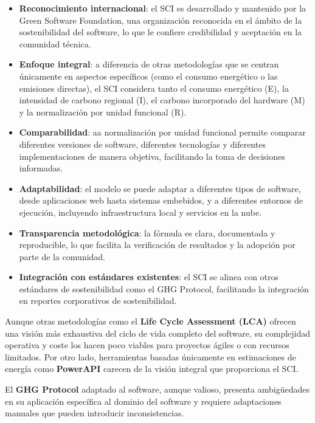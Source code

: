 \documentclass[12pt,a4paper]{report}
\begin{document}
\begin{itemize}
  \item \textbf{Reconocimiento internacional}: el SCI es desarrollado y mantenido por la Green Software Foundation, una organización reconocida en el ámbito de la sostenibilidad del software, lo que le confiere credibilidad y aceptación en la comunidad técnica.

  \item \textbf{Enfoque integral}: a diferencia de otras metodologías que se centran únicamente en aspectos específicos (como el consumo energético o las emisiones directas), el SCI considera tanto el consumo energético (E), la intensidad de carbono regional (I), el carbono incorporado del hardware (M) y la normalización por unidad funcional (R).

  \item \textbf{Comparabilidad}: aa normalización por unidad funcional permite comparar diferentes versiones de software, diferentes tecnologías y diferentes implementaciones de manera objetiva, facilitando la toma de decisiones informadas.

  \item \textbf{Adaptabilidad}: el modelo se puede adaptar a diferentes tipos de software, desde aplicaciones web hasta sistemas embebidos, y a diferentes entornos de ejecución, incluyendo infraestructura local y servicios en la nube.

  \item \textbf{Transparencia metodológica}: la fórmula es clara, documentada y reproducible, lo que facilita la verificación de resultados y la adopción por parte de la comunidad.

  \item \textbf{Integración con estándares existentes}: el SCI se alinea con otros estándares de sostenibilidad como el GHG Protocol, facilitando la integración en reportes corporativos de sostenibilidad.
\end{itemize}

Aunque otras metodologías como el \textbf{Life Cycle Assessment (LCA)} ofrecen una visión más exhaustiva del ciclo de vida completo del software, su complejidad operativa y coste los hacen poco viables para proyectos ágiles o con recursos limitados. Por otro lado, herramientas basadas únicamente en estimaciones de energía como \textbf{PowerAPI} carecen de la visión integral que proporciona el SCI.

El \textbf{GHG Protocol} adaptado al software, aunque valioso, presenta ambigüedades en su aplicación específica al dominio del software y requiere adaptaciones manuales que pueden introducir inconsistencias.
\end{document}
